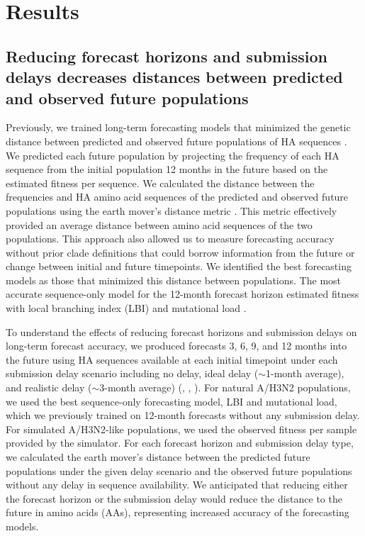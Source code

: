 \documentclass[9pt,lineno]{elife}
\begin{document}
\section{Results}

\subsection{Reducing forecast horizons and submission delays decreases distances between predicted and observed future populations}

Previously, we trained long-term forecasting models that minimized the genetic distance between predicted and observed future populations of HA sequences \citep{Huddleston2020}.
We predicted each future population by projecting the frequency of each HA sequence from the initial population 12 months in the future based on the estimated fitness per sequence.
We calculated the distance between the frequencies and HA amino acid sequences of the predicted and observed future populations using the earth mover's distance metric \citep{Rubner1998}.
This metric effectively provided an average distance between amino acid sequences of the two populations.
This approach also allowed us to measure forecasting accuracy without prior clade definitions that could borrow information from the future or change between initial and future timepoints.
We identified the best forecasting models as those that minimized this distance between populations.
The most accurate sequence-only model for the 12-month forecast horizon estimated fitness with local branching index (LBI) \citep{Neher:2014eu} and mutational load \citep{Luksza:2014hj}.

To understand the effects of reducing forecast horizons and submission delays on long-term forecast accuracy, we produced forecasts 3, 6, 9, and 12 months into the future using HA sequences available at each initial timepoint under each submission delay scenario including no delay, ideal delay ($\sim$1-month average), and realistic delay ($\sim$3-month average) (, , ).
For natural A/H3N2 populations, we used the best sequence-only forecasting model, LBI and mutational load, which we previously trained on 12-month forecasts without any submission delay.
For simulated A/H3N2-like populations, we used the observed fitness per sample provided by the simulator.
For each forecast horizon and submission delay type, we calculated the earth mover's distance between the predicted future populations under the given delay scenario and the observed future populations without any delay in sequence availability.
We anticipated that reducing either the forecast horizon or the submission delay would reduce the distance to the future in amino acids (AAs), representing increased accuracy of the forecasting models.
\end{document}
